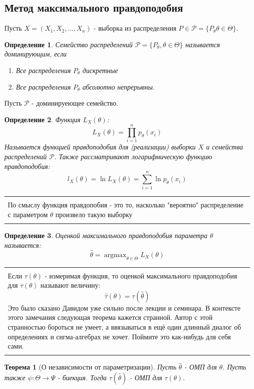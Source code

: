 \documentclass[a4paper,12pt]{article}
\newcommand{\sumin}{\sum\limits_{i=1}^n}
\newcommand{\sample}{X_1, X_2, ..., X_n}
\DeclareMathOperator*{\argmax}{argmax}
\newenvironment{annotation}{\begin{center}
    \begin{tabular}{|p{0.9\textwidth}|}
    \hline\\
}
{ 
    \\\\\hline
    \end{tabular} 
    \end{center}
}
\newtheorem{dfn}{Определение}[section]
\theoremstyle{named}
\newtheorem*{namedtheorem}{Теорема}
\begin{document}
\subsection{Метод максимального правдоподобия}
Пусть $X = (\sample)$  - выборка из распределения $P \in \mathcal{P} = \{P_\theta \theta \in \Theta \}$. 
\begin{dfn}
    Семейство распределений $\mathcal{P} = \{P_\theta, \theta \in \Theta \}$ называется доминирующим, если 
    \begin{enumerate}
        \item Все распределения $P_\theta$ дискретные 
        \item Все распределения $P_\theta$ абсолютно непрерывны.
    \end{enumerate}
\end{dfn}
Пусть $\mathcal{P}$ - доминируеющее семейство.
\begin{dfn}
    Функция $L_X(\theta)$:
    $$
        L_X(\theta) = \prod_{i=1}^n p_\theta(x_i) 
    $$
    Называется функцией правдоподобия для (реализации) выборки $X$ и семейства распределений $\mathcal{P}$. Также рассматривают 
    логарифмическую функцию правдоподобия:
    $$
        l_X(\theta) = \ln L_X(\theta) = \sumin \ln p_\theta(x_i)
    $$
\end{dfn}
\begin{annotation}
    По смыслу функция правдопобия - это то, насколько "вероятно" распределение с параметром $\theta$ произвело такую выборку
\end{annotation}
\begin{dfn}
    Оценкой максимального правдоподобия параметра $\theta$ называется:
    $$
        \hat\theta = \argmax_{\theta \in \Theta} L_X(\theta)
    $$
\end{dfn}
\begin{annotation}
    Если $\tau(\theta)$ - измеримая функция, то оценкой максимального правдоподобия для $\tau(\theta)$ называют величину:
    $$
        \hat\tau(\theta) = \tau(\hat\theta)
    $$
    Это было сказано Давидом уже сильно после лекции и семинара. В контексте этого замечания следующая теорема кажется странной. Автор с 
    этой странностью бороться не умеет, а ввязываться в ещё один длинный диалог об определениях и сигма-алгебрах не хочет. Поймите это 
    как-нибудь для себя сами.
\end{annotation}
\begin{namedtheorem}[О независимости от параметризации]
    Пусть $\hat\theta$ - ОМП для $\theta$. Пусть также $\psi: \Theta  \to \Psi$ - биекция. Тогда $\tau(\hat\theta)$ - ОМП для 
    $\tau(\theta)$.
\end{namedtheorem}
\end{document}
